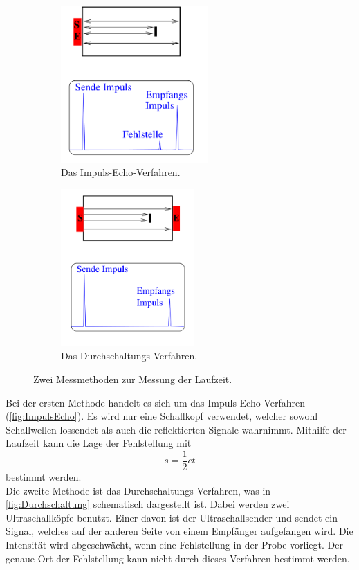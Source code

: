 \begin{figure}[H]
    \begin{subfigure}{0.48\textwidth}
       \centering
       \includegraphics[height=6cm]{build/Impuls_Echo.png}
       \caption{Das Impuls-Echo-Verfahren.}
       \label{fig:ImpulsEcho}
    \end{subfigure}
    \hfill
    \begin{subfigure}{0.48\textwidth}    
        \centering
        \includegraphics[height=6cm]{build/Durchschall.png}
        \caption{Das Durchschaltungs-Verfahren.}
        \label{fig:Durchschaltung}
    \end{subfigure}
    \caption{Zwei Messmethoden zur Messung der Laufzeit\cite{VUS1}.}
    \label{fig:Methoden}
\end{figure}
Bei der ersten Methode handelt es sich um das Impuls-Echo-Verfahren (\autoref{fig:ImpulsEcho}). Es wird nur eine Schallkopf verwendet, welcher
sowohl Schallwellen lossendet als auch die reflektierten Signale wahrnimmt.
Mithilfe der Laufzeit kann die Lage der Fehlstellung mit
\begin{equation}
    s = \frac{1}{2} c t
    \label{eqn:Strecke}
\end{equation}
bestimmt werden.\\
Die zweite Methode ist das Durchschaltungs-Verfahren, was in \autoref{fig:Durchschaltung} schematisch dargestellt ist. 
Dabei werden zwei Ultraschallköpfe benutzt. Einer davon ist der Ultraschallsender und sendet ein Signal, welches auf der anderen Seite von
einem Empfänger aufgefangen wird. Die Intensität wird abgeschwächt, wenn eine Fehlstellung in der Probe vorliegt. Der genaue Ort der 
Fehlstellung kann nicht durch dieses Verfahren bestimmt werden.
